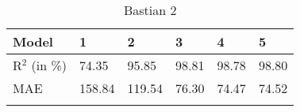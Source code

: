 
\begin{table}[H]
\centering
\begin{tabular}{p{}p{}p{}p{}p{}p{}}
    \toprule
    \textbf{Model} & \textbf{1}  & \textbf{2} & \textbf{3} &  \textbf{4} & \textbf{5}\\
    \midrule
    R$^{2}$ (in \%)& 74.35 & 95.85 & 98.81 & 98.78 & 98.80  \\
    \hline
    MAE & 158.84 & 119.54 & 76.30 & 74.47 & 74.52  \\\\
   
    \bottomrule
\end{tabular}
\caption{\label{table:basti2}Bastian 2}
\end{table}
